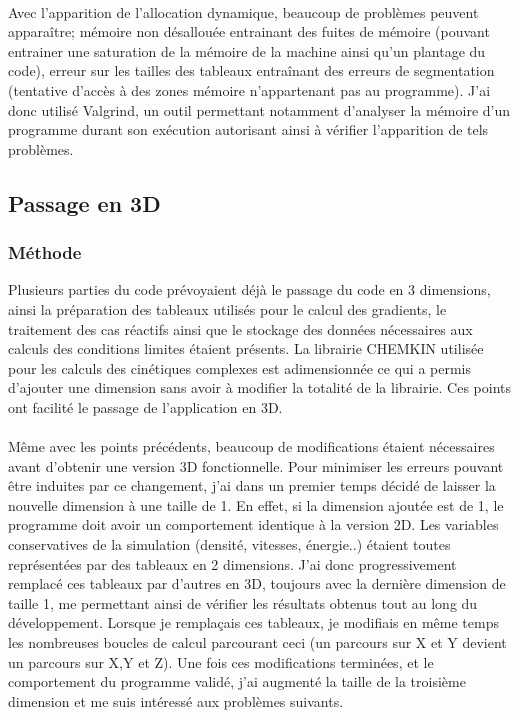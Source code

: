 \paragraph{}Avec l'apparition de l'allocation dynamique, beaucoup de problèmes peuvent apparaître; mémoire non désallouée entrainant des fuites de mémoire (pouvant entrainer une saturation de la mémoire de la machine ainsi qu'un plantage du code), erreur sur les tailles des tableaux entraînant des erreurs de segmentation (tentative d'accès à des zones mémoire n'appartenant pas au programme).
J'ai donc utilisé Valgrind, un outil permettant notamment d'analyser la mémoire d'un programme durant son exécution autorisant ainsi à vérifier l'apparition de tels problèmes.




\subsection{Passage en 3D}

\subsubsection{Méthode}\label{sec:3dmeth}
Plusieurs parties du code prévoyaient déjà le passage du code en 3 dimensions, ainsi la préparation des tableaux utilisés pour le calcul des gradients, le traitement des cas réactifs ainsi que le stockage des données nécessaires aux calculs des conditions limites étaient présents. La librairie CHEMKIN utilisée pour les calculs des cinétiques complexes est adimensionnée ce qui a permis d'ajouter une dimension sans avoir à modifier la totalité de la librairie. Ces points ont facilité le passage de l'application en 3D.


\paragraph{}Même avec les points précédents, beaucoup de modifications étaient nécessaires avant d'obtenir une version 3D fonctionnelle. Pour minimiser les erreurs pouvant être induites par ce changement, j'ai dans un premier temps décidé de laisser la nouvelle dimension à une taille de 1. En effet, si la dimension ajoutée est de 1, le programme doit avoir un comportement identique à la version 2D. Les variables conservatives de la simulation (densité, vitesses, énergie..) étaient toutes représentées par des tableaux en 2 dimensions. J'ai donc progressivement remplacé ces tableaux par d'autres en 3D, toujours avec la dernière dimension de taille 1,  me permettant ainsi de vérifier les résultats obtenus tout au long du développement. Lorsque je remplaçais ces tableaux, je modifiais en même temps les nombreuses boucles de calcul parcourant ceci (un parcours sur X et Y devient un parcours sur X,Y et Z). Une fois ces modifications terminées, et le comportement du programme validé, j'ai augmenté la taille de la troisième dimension et me suis intéressé aux problèmes suivants.

